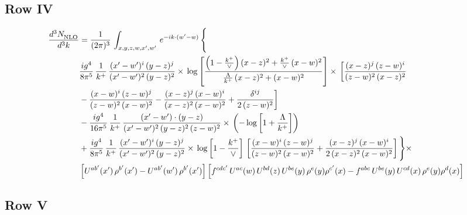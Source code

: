 \documentclass[9pt]{article}
\numberwithin{equation}{section}
\begin{document}
\subsection{Row IV}
\begin{align}
    \frac{d^{3}N_{\rm NLO}^{\rm}}{d^{3}k}  & =  \frac{1}{(2\pi)^{3}}\,
    \int_{x,y,z,w,x',w'}\,e^{-ik\cdot (w^\prime-w)}\,\Bigg\{\notag \\ & \frac{ig^{4}}{8\pi^{5}}\,\frac{1}{k^{+}}\,\frac{(x'-w')^{i}\,(y-z)^{j}}{(x'-w')^{2}\,(y-z)^{2}}\times\,\log{\left[\frac{\left(1-\frac{k^{+}}{\vee}\right)(x-z)^{2}+\frac{k^{+}}{\vee}\,(x-w)^{2}}{\frac{\Lambda}{k^{+}}\,(x-z)^{2}+(x-w)^{2}}\right]}\times\, \bigg[\frac{(x-z)^{j}\,(z-w)^{i}}{(z-w)^{2}\,(x-z)^{2}}\notag \\ & -\frac{(x-w)^{i}\,(z-w)^{j}}{(z-w)^{2}\,(x-w)^{2}}-\frac{(x-z)^{j}\,(x-w)^{i}}{(x-z)^{2}\,(x-w)^{2}}+\frac{\delta^{ij}}{2\,(z-w)^{2}}\bigg]\notag \\ & -\frac{ig^{4}}{16\pi^{5}}\,\frac{1}{k^{+}}\,\frac{(x'-w')\cdot (y-z)}{(x'-w')^{2}\,(y-z)^{2}\,(z-w)^{2}}\times\,\left(-\log{\left[1+\frac{\Lambda}{k^{+}}\right]}\right)\notag \\ & + \frac{ig^{4}}{8\pi^{5}}\,\frac{1}{k^{+}}\,\frac{(x'-w')^{i}\,(y-z)^{j}}{(x'-w')^{2}\,(y-z)^{2}}\times\, \log{\left[1-\frac{k^{+}}{\vee}\right]}\,\left[\frac{(x-w)^{i}\,(z-w)^{j}}{(z-w)^{2}\,(x-w)^{2}}+\frac{(x-z)^{j}\,(x-w)^{i}}{2\, (x-z)^{2}\,(x-w)^{2}}\right] \Bigg\}\times\notag \\ &  \left[U^{ab'}(x')\,\rho^{b'}(x')-U^{ab'}(w')\,\rho^{b'}(x')\right] \left[f^{cdc'}\,U^{ac}(w)\,U^{bd}(z)\,U^{be}(y)\,\rho^{e}(y)\rho^{c'}(x)-f^{abc}\,U^{be}(y)\,U^{cd}(x)\,\rho^{e}(y)\rho^{d}(x)\right]
\end{align}
\subsection{Row V}
\end{document}
